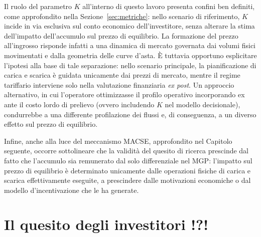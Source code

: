 

Il ruolo del parametro $K$ all'interno di questo lavoro presenta confini ben definiti, come approfondito nella Sezione~\ref{sec:metriche}: nello scenario di riferimento, $K$ incide in via esclusiva sul conto economico dell'investitore, senza alterare la stima dell'impatto dell'accumulo sul prezzo di equilibrio. La formazione del prezzo all'ingrosso risponde infatti a una dinamica di mercato governata dai volumi fisici movimentati e dalla geometria delle curve d'asta. È tuttavia opportuno esplicitare l'ipotesi alla base di tale separazione: nello scenario principale, la pianificazione di carica e scarica è guidata unicamente dai prezzi di mercato, mentre il regime tariffario interviene solo nella valutazione finanziaria \emph{ex post}. Un approccio alternativo, in cui l'operatore ottimizzasse il profilo operativo incorporando ex ante il costo lordo di prelievo (ovvero includendo $K$ nel modello decisionale), condurrebbe a una differente profilazione dei flussi e, di conseguenza, a un diverso effetto sul prezzo di equilibrio. 

Infine, anche alla luce del meccanismo \ac{MACSE}, approfondito nel Capitolo seguente, occorre sottolineare che la validità del quesito di ricerca prescinde dal fatto che l'accumulo sia remunerato dal solo differenziale nel \ac{MGP}: l'impatto sul prezzo di equilibrio è determinato unicamente dalle operazioni fisiche di carica e scarica effettivamente eseguite, a prescindere dalle motivazioni economiche o dal modello d'incentivazione che le ha generate.



\section{Il quesito degli investitori !?!}
\label{sec:quesito}


